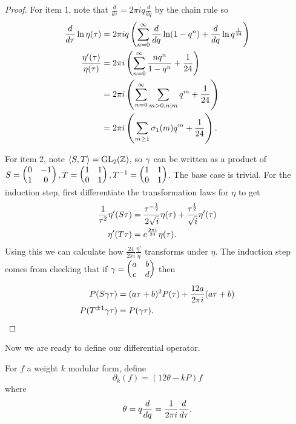 \begin{proof}
For item 1, note that $\frac{d}{d\tau}=2\pi i q\frac{d}{dq}$ by the chain rule so
\begin{align*}
\frac{d}{d\tau}\ln \eta(\tau)&=2\pi i q\left( {\sum_{n=0}^{\infty} \frac{d}{dq}\ln(1-q^n)+\frac{d}{dq} \ln q^{\frac{1}{24}}
} \right)\\
\frac{\eta'(\tau)}{\eta(\tau)}&=2\pi i\left( {\sum_{n=0}^{\infty} \frac{nq^n}{1-q^n}+\frac{1}{24}} \right)\\
&=2\pi i\left( {\sum_{n=0}^{\infty} \sum_{m>0,n|m}q^{m}+\frac{1}{24}} \right)\\
&=2\pi i\left( {\sum_{m\ge 1}\sigma_1(m)q^m+\frac{1}{24}} \right).
\end{align*}

For item 2, note $\left\langle {S,T}\right\rangle=\operatorname{GL}_2(\mathbb{Z})$, so $\gamma$ can be written as a product of $S=\begin{pmatrix} {0}&{-1}\\ {1}&{0} \end{pmatrix},T=\begin{pmatrix} {1}&{1}\\ {0}&{1} \end{pmatrix},T^{-1}=\begin{pmatrix} {1}&{1}\\ {0}&{1} \end{pmatrix}$. The base case is trivial.
For the induction step, first differentiate the transformation laws for $\eta$ to get
\begin{align*}
\frac{1}{\tau^2}\eta'(S\tau)&=\frac{\tau^{-\frac{1}{2}}}{2\sqrt i}\eta(\tau)+\frac{\tau^{\frac{1}{2}}}{\sqrt i} \eta'(\tau)\\
\eta'(T\tau)&=e^{\frac{2\pi i}{24}}\eta(\tau).
\end{align*}
Using this we can calculate how $\frac{24}{2\pi i}\frac{\eta'}{\eta}$ transforms under $\eta$. The induction step comes from checking that if $\gamma=\begin{pmatrix} {a}&{b}\\ {c}&{d} \end{pmatrix}$ then
\begin{align*}
P(S\gamma\tau)&=(a\tau+b)^2P(\tau)+\frac{12a}{2\pi i}(a\tau+b)\\
P(T^{\pm 1}\gamma\tau)&=P(\gamma\tau).
\end{align*}
\end{proof}

Now we are ready to define our differential operator. 
\begin{df}
For $f$ a weight $k$ modular form, define
\[
\partial_k(f)=(12\theta-kP)f
\]
where
\[
\theta=q\frac{d}{dq}=\frac{1}{2\pi i}\frac{d}{d\tau}.
\]
\end{df}

